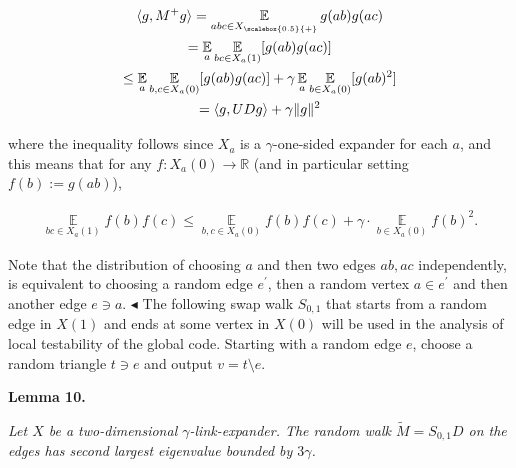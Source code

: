 \documentclass[10pt,a4paper]{article}
\begin{document}
\[\begin{gathered}
\displaystyle\langle g,M^{+}g\rangle \displaystyle=\operatorname*{\mathbb{E}}_{abc\in{X}_{\scalebox{0.5}{+}}}g(ab)g(ac) \\
\displaystyle=\operatorname*{\mathbb{E}}_{a}\operatorname*{\mathbb{E}}_{bc\in X_{a}(1)}[g(ab)g(ac)] \\
\displaystyle\leq\operatorname*{\mathbb{E}}_{a}\operatorname*{\mathbb{E}}_{b,c\in X_{a}(0)}[g(ab)g(ac)]+\gamma\operatorname*{\mathbb{E}}_{a}\operatorname*{\mathbb{E}}_{b\in X_{a}(0)}[g(ab)^{2}] \\
\displaystyle=\langle g,UDg\rangle+\gamma\lVert g\rVert^{2}
\end{gathered}\]


where the inequality follows since $X_{a}$ is a $\gamma$-one-sided expander for each $a$, and this means that for any $f:X_{a}(0)\to\mathbb{R}$ (and in particular setting $f(b):=g(ab)$),\par


\[\begin{gathered}
\operatorname*{\mathbb{E}}_{bc\in X_{a}(1)}f(b)f(c)\leq\operatorname*{\mathbb{E}}_{b,c\in X_{a}(0)}f(b)f(c)+\gamma\cdot\operatorname*{\mathbb{E}}_{b\in X_{a}(0)}f(b)^{2}.
\end{gathered}\]


Note that the distribution of choosing $a$ and then two edges $ab,ac$ independently, is equivalent to choosing a random edge $e^{\prime}$, then a random vertex $a\in e^{\prime}$ and then another edge $e\ni a$.
$\blacktriangleleft$
The following swap walk $S_{0,1}$ that starts from a random edge in $X(1)$ and ends at some vertex in $X(0)$ will be used in the analysis of local testability of the global code. Starting with a random edge $e$, choose a random triangle $t\ni e$ and output $v=t\setminus e$.\par





\par\medskip\noindent\textbf{
\textbf{Lemma 10}\textbf{.}
}\par



\emph{Let $X$ be a two-dimensional $\gamma$-link-expander. The random walk $\tilde{M}=S_{0,1}D$ on the edges has second largest eigenvalue bounded by $3\gamma$.}\par



\end{document}
